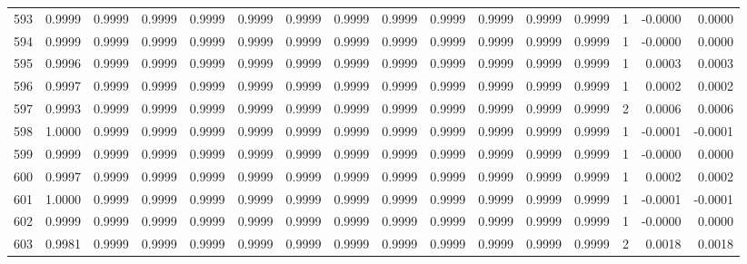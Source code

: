 \begin{tabular}{lrrrrrrrrrrrrrrr}
593 &      0.9999 &  0.9999 &  0.9999 &  0.9999 &  0.9999 &  0.9999 &  0.9999 &  0.9999 &  0.9999 &  0.9999 &   0.9999 &     0.9999 &      1 &                   -0.0000 &                     0.0000 \\
594 &      0.9999 &  0.9999 &  0.9999 &  0.9999 &  0.9999 &  0.9999 &  0.9999 &  0.9999 &  0.9999 &  0.9999 &   0.9999 &     0.9999 &      1 &                   -0.0000 &                     0.0000 \\
595 &      0.9996 &  0.9999 &  0.9999 &  0.9999 &  0.9999 &  0.9999 &  0.9999 &  0.9999 &  0.9999 &  0.9999 &   0.9999 &     0.9999 &      1 &                    0.0003 &                     0.0003 \\
596 &      0.9997 &  0.9999 &  0.9999 &  0.9999 &  0.9999 &  0.9999 &  0.9999 &  0.9999 &  0.9999 &  0.9999 &   0.9999 &     0.9999 &      1 &                    0.0002 &                     0.0002 \\
597 &      0.9993 &  0.9999 &  0.9999 &  0.9999 &  0.9999 &  0.9999 &  0.9999 &  0.9999 &  0.9999 &  0.9999 &   0.9999 &     0.9999 &      2 &                    0.0006 &                     0.0006 \\
598 &      1.0000 &  0.9999 &  0.9999 &  0.9999 &  0.9999 &  0.9999 &  0.9999 &  0.9999 &  0.9999 &  0.9999 &   0.9999 &     0.9999 &      1 &                   -0.0001 &                    -0.0001 \\
599 &      0.9999 &  0.9999 &  0.9999 &  0.9999 &  0.9999 &  0.9999 &  0.9999 &  0.9999 &  0.9999 &  0.9999 &   0.9999 &     0.9999 &      1 &                   -0.0000 &                     0.0000 \\
600 &      0.9997 &  0.9999 &  0.9999 &  0.9999 &  0.9999 &  0.9999 &  0.9999 &  0.9999 &  0.9999 &  0.9999 &   0.9999 &     0.9999 &      1 &                    0.0002 &                     0.0002 \\
601 &      1.0000 &  0.9999 &  0.9999 &  0.9999 &  0.9999 &  0.9999 &  0.9999 &  0.9999 &  0.9999 &  0.9999 &   0.9999 &     0.9999 &      1 &                   -0.0001 &                    -0.0001 \\
602 &      0.9999 &  0.9999 &  0.9999 &  0.9999 &  0.9999 &  0.9999 &  0.9999 &  0.9999 &  0.9999 &  0.9999 &   0.9999 &     0.9999 &      1 &                   -0.0000 &                     0.0000 \\
603 &      0.9981 &  0.9999 &  0.9999 &  0.9999 &  0.9999 &  0.9999 &  0.9999 &  0.9999 &  0.9999 &  0.9999 &   0.9999 &     0.9999 &      2 &                    0.0018 &                     0.0018 \\

\end{tabular}
